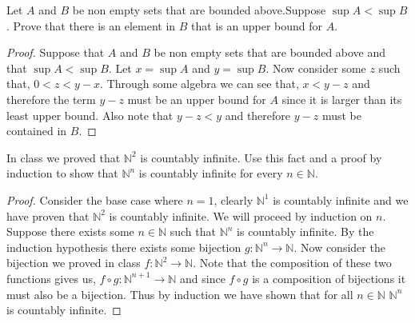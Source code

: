 \documentclass[12pt]{article}
\makeatletter
\theoremstyle{homework}
\newenvironment{exercise}[1]
{\def\@currentlabel{#1}\exercisecore}
{\endexercisecore}
\newcommand{\Nats}{\ensuremath{\mathbb N}}
\makeatother
\begin{document}
\begin{exercise}{1}Let $A$ and $B$ be non empty sets that are bounded above.Suppose $\sup A < \sup B$. Prove that there is an element in $B$ that is an
	upper bound for $A$.\\

	\begin{proof}
		Suppose that $A$ and $B$ be non empty sets that are bounded above and that $\sup A < \sup B$. Let $x = \sup A$ and $y = \sup B$. Now consider some $z$
		such that, $0 < z < y-x$. Through some algebra we can see that, $x < y - z$  and therefore the term $y - z$ must be an upper bound for $A$ since it is larger than its least upper bound. Also 
		note that $y - z < y$ and therefore $y-z$ must be contained in $B$.
	\end{proof}

\end{exercise}


\begin{exercise}{2} In class we proved that $\Nats^2$ is countably infinite. Use this fact and a proof by induction to show that $\Nats^n$ is countably infinite for every $n \in \Nats$. \\

  \begin{proof}
    Consider the base case where $n = 1$, clearly $\Nats^1$ is countably infinite and we have proven that $\Nats^2$ is countably infinite. We will proceed by induction on $n$. 
    Suppose there exists some $n\in \Nats$ such that $\Nats^n$ is countably infinite. By the induction hypothesis there exists some bijection 
     $g: \Nats^n \to \Nats$. Now consider the bijection we proved in class $f: \Nats^2 \to \Nats$. Note that the composition of these two functions gives us, 
     $f\circ g: \Nats^{n+1} \to \Nats $ and since $f\circ g$ is a composition of bijections it must also be a bijection. Thus by induction we have shown that for all $n\in \Nats$
     $\Nats^n$ is countably infinite.     
  \end{proof}
  
\end{exercise}
\vspace{.5in}
\end{document}
